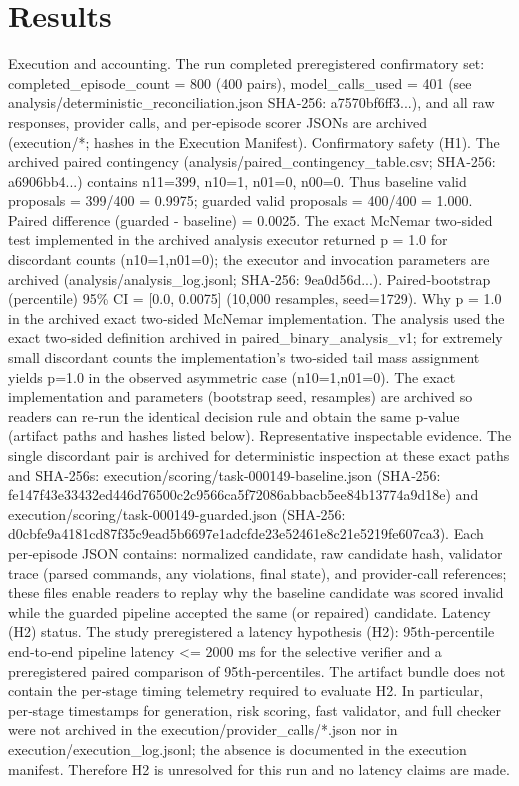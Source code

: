 \documentclass[conference]{IEEEtran}
\begin{document}
\section{Results}
Execution and accounting. The run completed preregistered confirmatory set: completed\_episode\_count = 800 (400 pairs), model\_calls\_used = 401 (see analysis/deterministic\_reconciliation.json SHA‑256: a7570bf6ff3...), and all raw responses, provider calls, and per‑episode scorer JSONs are archived (execution/*; hashes in the Execution Manifest).
Confirmatory safety (H1). The archived paired contingency (analysis/paired\_contingency\_table.csv; SHA‑256: a6906bb4...) contains n11=399, n10=1, n01=0, n00=0. Thus baseline valid proposals = 399/400 = 0.9975; guarded valid proposals = 400/400 = 1.000. Paired difference (guarded - baseline) = 0.0025. The exact McNemar two‑sided test implemented in the archived analysis executor returned p = 1.0 for discordant counts (n10=1,n01=0); the executor and invocation parameters are archived (analysis/analysis\_log.jsonl; SHA‑256: 9ea0d56d...). Paired‑bootstrap (percentile) 95\% CI = [0.0, 0.0075] (10,000 resamples, seed=1729).
Why p = 1.0 in the archived exact two‑sided McNemar implementation. The analysis used the exact two‑sided definition archived in paired\_binary\_analysis\_v1; for extremely small discordant counts the implementation's two‑sided tail mass assignment yields p=1.0 in the observed asymmetric case (n10=1,n01=0). The exact implementation and parameters (bootstrap seed, resamples) are archived so readers can re‑run the identical decision rule and obtain the same p‑value (artifact paths and hashes listed below).
Representative inspectable evidence. The single discordant pair is archived for deterministic inspection at these exact paths and SHA‑256s: execution/scoring/task-000149-baseline.json (SHA‑256: fe147f43e33432ed446d76500c2c9566ca5f72086abbacb5ee84b13774a9d18e) and execution/scoring/task-000149-guarded.json (SHA‑256: d0cbfe9a4181cd87f35c9ead5b6697e1adcfde23e52461e8c21e5219fe607ca3). Each per‑episode JSON contains: normalized candidate, raw candidate hash, validator trace (parsed commands, any violations, final state), and provider‑call references; these files enable readers to replay why the baseline candidate was scored invalid while the guarded pipeline accepted the same (or repaired) candidate.
Latency (H2) status. The study preregistered a latency hypothesis (H2): 95th‑percentile end‑to‑end pipeline latency <= 2000 ms for the selective verifier and a preregistered paired comparison of 95th‑percentiles. The artifact bundle does not contain the per‑stage timing telemetry required to evaluate H2. In particular, per‑stage timestamps for generation, risk scoring, fast validator, and full checker were not archived in the execution/provider\_calls/*.json nor in execution/execution\_log.jsonl; the absence is documented in the execution manifest. Therefore H2 is unresolved for this run and no latency claims are made.
\end{document}
